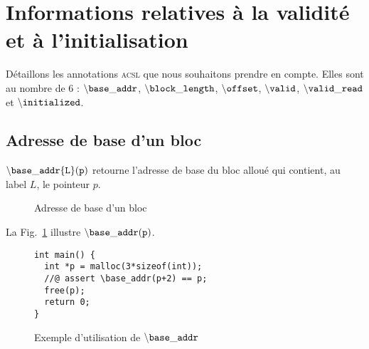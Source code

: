


\section{Informations relatives à la validité et à l'initialisation}


Détaillons les annotations \textsc{acsl} que nous souhaitons prendre en compte.
Elles sont au nombre de 6 : ${\tt \backslash base\_addr}$,
${\tt \backslash block\_length}$, ${\tt \backslash offset}$,
${\tt \backslash valid}$, ${\tt \backslash valid\_read}$ et
${\tt \backslash initialized}$.

\subsection{Adresse de base d'un bloc}

${\tt \backslash base\_addr\{L\}(p)}$ retourne l'adresse de base du bloc alloué
qui contient, au label $L$, le pointeur $p$.

\begin{figure}[h]
  \begin{center}
  \end{center}
  \caption{Adresse de base d'un bloc}
  \label{fig:base-addr}
\end{figure}

La Fig.~\ref{fig:base-addr}
illustre ${\tt \backslash base\_addr(p)}$.

\begin{figure}[h]
\begin{lstlisting}
int main() {
  int *p = malloc(3*sizeof(int));
  //@ assert \base_addr(p+2) == p;
  free(p);
  return 0;
}
\end{lstlisting}
\caption{Exemple d'utilisation de ${\tt \backslash base\_addr}$}
\label{fig:base-addr-example}
\end{figure}

